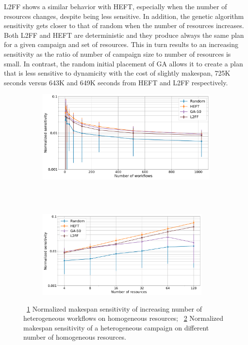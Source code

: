 L2FF shows a similar behavior with HEFT, especially when the number of resources changes, despite being less sensitive.
In addition, the genetic algorithm sensitivity gets closer to that of random when the number of resources increases.
Both L2FF and HEFT are deterministic and they produce always the same plan for a given campaign and set of resources.
This in turn results to an increasing sensitivity as the ratio of number of campaign size to number of resources is small.
In contrast, the random initial placement of GA allows it to create a plan that is less sensitive to dynamicity with the cost of slightly makespan, 725K seconds versus 643K and 649K seconds from HEFT and L2FF respectively.

\begin{figure}[ht!]
    \centering
    \begin{subfigure}[b]{0.85\textwidth}
        \includegraphics[width=.95\textwidth]{figures/campaign/StHeteroCampaigns_4DynHomoResourcesSens.pdf}
        \caption{}
        \label{fig:StHeteroCampaigns_4DynHomoResourcesSens}
    \end{subfigure}\\
    ~ 
    \begin{subfigure}[b]{0.85\textwidth}
        \includegraphics[width=0.95\textwidth]{figures/campaign/DynHomoResources_StHeteroCampaignsSens.pdf}
        \caption{}
        \label{fig:DynHomoResources_StHeteroCampaignsSens}
    \end{subfigure}
    \caption{~\ref{fig:StHeteroCampaigns_4DynHomoResourcesSens} Normalized makespan sensitivity  of increasing number of heterogeneous workflows on homogeneous resources;
        ~\ref{fig:DynHomoResources_StHeteroCampaignsSens} Normalized makespan sensitivity  of a heterogeneous campaign on different number of homogeneous resources.}
    \label{fig:dyn_hetero_homog_sens_analysis}
\end{figure}

